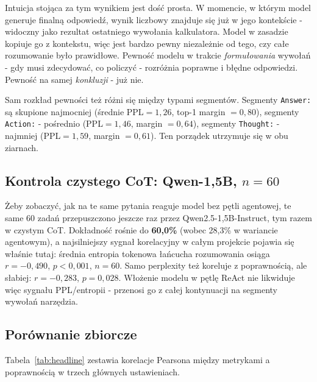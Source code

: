Intuicja stojąca za tym wynikiem jest dość prosta. W momencie,
w którym model generuje finalną odpowiedź, wynik liczbowy znajduje
się już w jego kontekście - widoczny jako rezultat ostatniego
wywołania kalkulatora. Model w zasadzie kopiuje go z kontekstu,
więc jest bardzo pewny niezależnie od tego, czy całe rozumowanie
było prawidłowe. Pewność modelu w trakcie \emph{formułowania}
wywołań - gdy musi zdecydować, co policzyć - rozróżnia poprawne
i błędne odpowiedzi. Pewność na samej \emph{konkluzji} - już nie.

Sam rozkład pewności też różni się między typami segmentów.
Segmenty \texttt{Answer:} są skupione najmocniej (średnie PPL$=1{,}26$,
top-1 margin $=0{,}80$), segmenty \texttt{Action:} - pośrednio
(PPL$=1{,}46$, margin $=0{,}64$), segmenty \texttt{Thought:} - najmniej
(PPL$=1{,}59$, margin $=0{,}61$). Ten porządek utrzymuje się w obu
ziarnach.

\subsection{Kontrola czystego CoT: Qwen-1,5B, $n=60$}
\label{sec:wyniki-cot15}

Żeby zobaczyć, jak na te same pytania reaguje model bez pętli
agentowej, te same 60 zadań przepuszczono jeszcze raz przez
Qwen2.5-1,5B-Instruct, tym razem w czystym CoT. Dokładność rośnie
do \textbf{60,0\%} (wobec 28,3\% w wariancie agentowym), a najsilniejszy
sygnał korelacyjny w całym projekcie pojawia się właśnie tutaj:
średnia entropia tokenowa łańcucha rozumowania osiąga $r = -0{,}490$,
$p < 0{,}001$, $n = 60$. Samo perplexity też koreluje z poprawnością,
ale słabiej: $r = -0{,}283$, $p = 0{,}028$. Włożenie modelu w pętlę
ReAct nie likwiduje więc sygnału PPL/entropii - przenosi go z całej
kontynuacji na segmenty wywołań narzędzia.

\subsection{Porównanie zbiorcze}
\label{sec:headline}

Tabela~\ref{tab:headline} zestawia korelacje Pearsona między metrykami
a poprawnością w trzech głównych ustawieniach.

